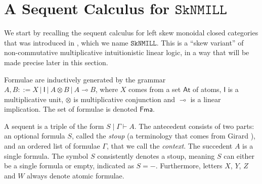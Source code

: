 \documentclass[sn-mathphys-num]{sn-jnl}%
\newcommand{\GG}{\Gamma}
\newcommand{\vd}{\vdash}
\newcommand{\ot}{\otimes}
\newcommand{\lolli}{\multimap}
\newcommand{\unit}{\mathsf{I}}
\newcommand{\SkNMILL}{$\mathtt{SkNMILL}$}
\newcommand{\SkBiCT}{$\mathtt{SkBiCT}$}
\newcommand{\SkBiCA}{$\mathtt{SkBiCA}$}
\newcommand{\mf}[1]{\mathsf{#1}}
\theoremstyle{thmstyleone}%
\theoremstyle{thmstyletwo}%
\theoremstyle{thmstylethree}%
\begin{document}

\section{A Sequent Calculus for \SkNMILL}\label{sec:syntax}
We start by recalling the sequent calculus for left skew monoidal closed categories that was introduced in \cite{UVW:protsn}, which we name \SkNMILL. This is a ``skew variant'' of non-commutative multiplicative intuitionistic linear logic, in a way that will be made precise later in this section.

Formulae are inductively generated by the grammar $A, B::= X \ | \ \unit \ | \ A \ot B \ | \ A \lolli B$, where $X$ comes from a set $\mathsf{At}$ of atoms, $\unit$ is a multiplicative unit, $\ot$ is multiplicative conjunction and $\lolli$ is a linear implication. The set of formulae is denoted $\mf{Fma}$.

A sequent is a triple of the form $S \mid \GG \vd A$. The antecedent consists of two parts: an optional formula $S$, called the \emph{stoup} (a terminology that comes from Girard \cite{girard:constructive:91}), and an ordered list of formulae $\GG$, that we call the \emph{context}. The succedent $A$ is a single formula.
The symbol $S$ consistently denotes a stoup, meaning $S$ can either be a single formula or empty, indicated as $S = {-}$. Furthermore, letters $X$, $Y$, $Z$ and $W$ always denote atomic formulae.
\end{document}
